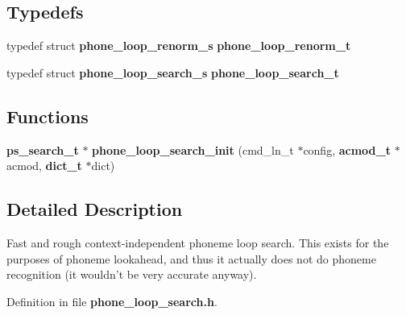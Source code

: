 \subsection*{Typedefs}
\begin{DoxyCompactItemize}
\item 
typedef struct {\bf phone\-\_\-loop\-\_\-renorm\-\_\-s} {\bfseries phone\-\_\-loop\-\_\-renorm\-\_\-t}\label{phone__loop__search_8h_a313734607dd312343fd138ccc32b9228}

\item 
typedef struct {\bf phone\-\_\-loop\-\_\-search\-\_\-s} {\bfseries phone\-\_\-loop\-\_\-search\-\_\-t}\label{phone__loop__search_8h_aff0f48051fd9e2725230896875887aa2}

\end{DoxyCompactItemize}
\subsection*{Functions}
\begin{DoxyCompactItemize}
\item 
{\bf ps\-\_\-search\-\_\-t} $\ast$ {\bfseries phone\-\_\-loop\-\_\-search\-\_\-init} (cmd\-\_\-ln\-\_\-t $\ast$config, {\bf acmod\-\_\-t} $\ast$acmod, {\bf dict\-\_\-t} $\ast$dict)\label{phone__loop__search_8h_a2308707c1a22ea9b0495f6c7f151f806}

\end{DoxyCompactItemize}


\subsection{Detailed Description}
Fast and rough context-\/independent phoneme loop search. This exists for the purposes of phoneme lookahead, and thus it actually does not do phoneme recognition (it wouldn't be very accurate anyway). 

Definition in file {\bf phone\-\_\-loop\-\_\-search.\-h}.

